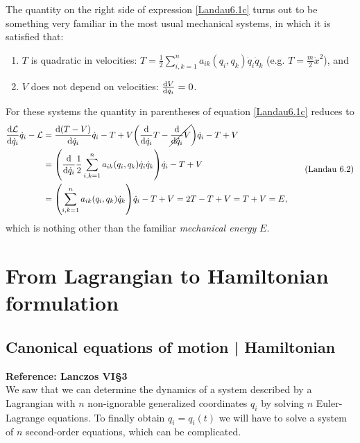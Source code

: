\documentclass[12pt, english, a4paper]{article}
\begin{document}
The quantity on the right side of expression \eqref{Landau6.1c} turns out to be something very familiar in the most usual mechanical systems, in which it is satisfied that:
\begin{enumerate}
	\item \(T\) is quadratic in velocities: \(T= \frac{1}{2} \displaystyle\sum_{i,k=1}^n a_{ik}(q_i, q_k) \dot{q}_i \dot{q}_k\) (e.g. \(T= \frac{m}{2} \dot{x}^2\)), and
	\item \(V\) does not depend on velocities: \(\dv{V}{\dot{q}_i}=0\).%
\end{enumerate}
For these systems the quantity in parentheses of equation \eqref{Landau6.1c} reduces to
\begin{equation}\label{unsereLandau6.2}
	\begin{aligned}
		\dv{\mathcal{L}}{\dot{q}_i} \dot{q}_i - \mathcal{L} &=
		\dv{\pqty{T-V}}{\dot{q}_i} \dot{q}_i - T+ V
		\pqty{\dv{\dot{q}_i} T - \cancel{\dv{\dot{q}_i} V}} \dot{q}_i - T+ V \\
		& = \pqty{\dv{\dot{q}_i} \frac{1}{2} \displaystyle\sum_{i,k=1}^n a_{ik}(q_i, q_k) \dot{q}_i \dot{q}_k } \dot{q}_i - T+ V \\
		& = \pqty{ \displaystyle\sum_{i,k=1}^n a_{ik}(q_i, q_k) \dot{q}_k } \dot{q}_i - T+ V = 2 T - T + V = T+ V = E,
	\end{aligned}
	\tag{Landau 6.2}
\end{equation}
which is nothing other than the familiar \emph{mechanical energy} \(E\).


\section{From Lagrangian to Hamiltonian formulation}

\subsection{Canonical equations of motion | Hamiltonian} %
\textbf{Reference: Lanczos VI\S3}\\

We saw that we can determine the dynamics of a system described by a Lagrangian with \(n\) non-ignorable generalized coordinates \(q_i\) by solving \(n\) Euler-Lagrange equations.
To finally obtain \(q_i= q_i(t)\) we will have to solve a system of \(n\) second-order equations, which can be complicated.
\end{document}
